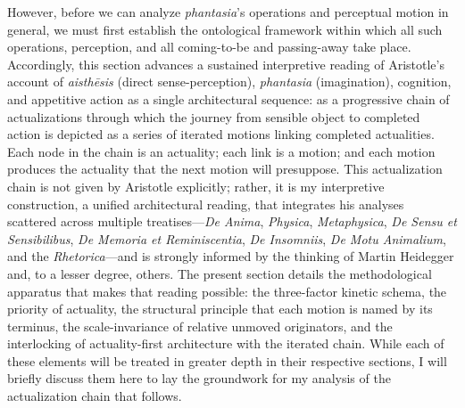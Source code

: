 \documentclass{article}
\begin{document}
However, before we can analyze \textit{phantasia}'s operations and perceptual motion in general, we must first establish the ontological framework within which all such operations, perception, and all coming-to-be and passing-away take place. Accordingly, this section advances a sustained interpretive reading of Aristotle's account of \textit{aisthēsis} (direct sense-perception), \textit{phantasia} (imagination), cognition, and appetitive action as a single architectural sequence: as a progressive chain of actualizations through which the journey from sensible object to completed action is depicted as a series of iterated motions linking completed actualities. Each node in the chain is an actuality; each link is a motion; and each motion produces the actuality that the next motion will presuppose. This actualization chain is not given by Aristotle explicitly; rather, it is my interpretive construction, a unified architectural reading, that integrates his analyses scattered across multiple treatises---\textit{De Anima}, \textit{Physica}, \textit{Metaphysica}, \textit{De Sensu et Sensibilibus}, \textit{De Memoria et Reminiscentia}, \textit{De Insomniis}, \textit{De Motu Animalium}, and the \textit{Rhetorica}---and is strongly informed by the thinking of Martin Heidegger and, to a lesser degree, others. The present section details the methodological apparatus that makes that reading possible: the three-factor kinetic schema, the priority of actuality, the structural principle that each motion is named by its terminus, the scale-invariance of relative unmoved originators, and the interlocking of actuality-first architecture with the iterated chain. While each of these elements will be treated in greater depth in their respective sections, I will briefly discuss them here to lay the groundwork for my analysis of the actualization chain that follows. 
\end{document}
